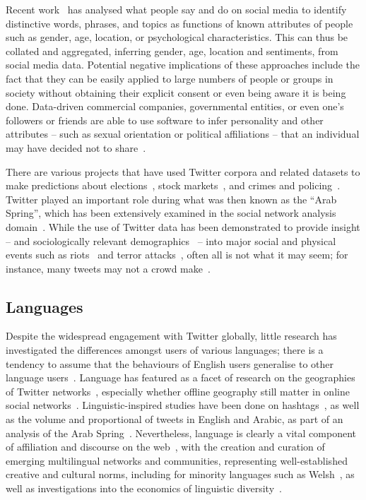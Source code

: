 Recent
work~\cite{blamey-et-al-2012,schwartz-et-al:2013,blamey-et-al-2013,oatley+crick:2014,mostafa-et-al-ai2016}
has analysed what people say and do on social media to identify
distinctive words, phrases, and topics as functions of known
attributes of people such as gender, age, location, or psychological
characteristics. This can thus be collated and aggregated, inferring
gender, age, location and sentiments, from social media
data. Potential negative implications of these approaches include the
fact that they can be easily applied to large numbers of people or
groups in society without obtaining their explicit consent or even
being aware it is being done. Data-driven commercial companies,
governmental entities, or even one's followers or friends are able to
use software to infer personality and other attributes -- such as
sexual orientation or political affiliations -- that an individual may
have decided not to share~\cite{lambiotte+kosinski:2014,postsm:2014}.

There are various projects that have used Twitter corpora and related
datasets to make predictions about
elections~\cite{tumasjan-et-al:2010}, stock
markets~\cite{zhang-et-al:2011}, and crimes and
policing~\cite{gerber:2014,oatley+crick:2015}. Twitter played an
important role during what was then known as the ``Arab Spring'',
which has been extensively examined in the social network analysis
domain~\cite{lotan-et-al:2011,howard-et-al:2011,comunello+anzera:2012,wolfsfeld-et-al:2013,bruns-et-al:2013}.
While the use of Twitter data has been demonstrated to provide insight
-- and sociologically relevant demographics~\cite{sloan-et-al:2013} --
into major social and physical events such as
riots~\cite{procter-et-al:2013} and terror
attacks~\cite{burnap-et-al:2014}, often all is not what it may seem;
for instance, many tweets may not a crowd
make~\cite{liang-et-al:2013}.

\subsection{Languages}

Despite the widespread engagement with Twitter globally, little
research has investigated the differences amongst users of various
languages; there is a tendency to assume that the behaviours of
English users generalise to other language
users~\cite{hong-et-al:2011}. Language has featured as a facet of
research on the geographies of Twitter
networks~\cite{takhteyev-et-al:2012}, especially whether offline
geography still matter in online social
networks~\cite{kulshrestha-et-al:2012}. Linguistic-inspired studies
have been done on hashtags~\cite{cunha-et-al:2011}, as well as the
volume and proportional of tweets in English and Arabic, as part of an
analysis of the Arab Spring~\cite{bruns-et-al:2013}. Nevertheless,
language is clearly a vital component of affiliation and discourse on
the web~\cite{zappavigna+martin:2012}, with the creation and curation
of emerging multilingual networks and communities, representing
well-established creative and cultural norms, including for minority
languages such as Welsh~\cite{gj+uj:2013}, as well as investigations
into the economics of linguistic
diversity~\cite{ginsburgh+weber:2011}.

